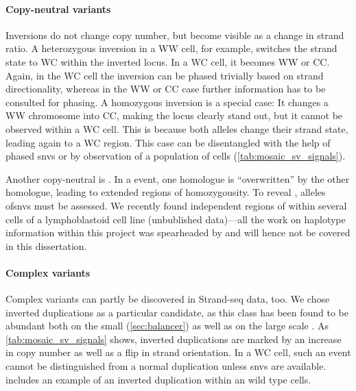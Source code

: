 \paragraph{Copy-neutral variants}
Inversions do not change copy number, but become visible as a change in strand
ratio. A heterozygous inversion in a WW cell, for example, switches the strand
state to WC within the inverted locus. In a WC cell, it becomes WW or CC. Again,
in the WC cell the inversion can be phased trivially based on strand
directionality, whereas in the WW or CC case further \snv information has to be
consulted for phasing. A homozygous inversion is a special case: It changes a WW
chromosome into CC, making the locus clearly stand out, but it cannot be
observed within a WC cell. This is because both alleles change their strand
state, leading again to a WC region. This case can be disentangled with the help
of phased \acp{snv} or by observation of a population of cells
(\cref{tab:mosaic_sv_signals}).

Another copy-neutral \sv is \loh. In a \loh event, one homologue is
``overwritten'' by the other homologue, leading to extended regions of
homozygousity. To reveal \loh, alleles of\acp{snv} must be assessed. We recently
found independent regions of \loh within several cells of a lymphoblastoid cell
line (unbublished data)---all the work on haplotype information within this
project was spearheaded by \david and will hence not be covered in this
dissertation.

\paragraph{Complex variants}
Complex variants can partly be discovered in Strand-seq data, too. We chose
inverted duplications as a particular candidate, as this class has been found to
be abundant both on the small (\cref{sec:balancer}) as well as on the large
scale \citep{Chaisson2017}. As \cref{tab:mosaic_sv_signals} shows, inverted
duplications are marked by an increase in copy number as well as a flip in
strand orientation. In a WC cell, such an event cannot be distinguished from a
normal duplication unless \acp{snv} are available. 
includes an example of an inverted duplication within an \rpe wild type cells.


